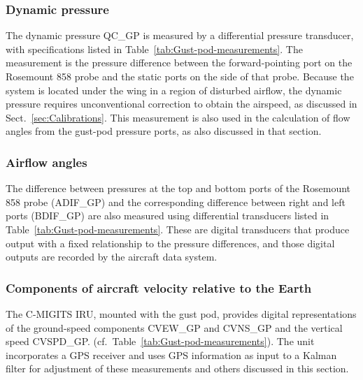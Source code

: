 \documentclass[12pt,twoside,english]{article}\usepackage[]{graphicx}\usepackage[]{color}
\let\OrgIndex\index
\renewcommand*{\index}[1]{\OrgIndex{#1}}
\begin{document}
{\subsubsection{Dynamic pressure}

The dynamic pressure QC\_GP is measured by a differential pressure transducer,  with specifications listed in Table~\ref{tab:Gust-pod-measurements}. The measurement is the pressure difference between the forward-pointing port on the Rosemount 858 probe and the static ports on the side of that probe. Because the system is located under the wing in a region of disturbed airflow, the dynamic pressure requires unconventional correction to obtain the airspeed, as discussed in Sect.~\ref{sec:Calibrations}. This measurement is also used in the calculation of flow angles from the gust-pod pressure ports, as also discussed in that section. 


\subsubsection{Airflow angles}

The difference between pressures at  the top and bottom ports of the Rosemount 858 probe (ADIF\_GP) and the corresponding difference between right and left ports (BDIF\_GP) are also measured using differential transducers listed in Table~\ref{tab:Gust-pod-measurements}. These are digital transducers that produce output with a fixed relationship to the pressure differences, and those digital outputs are recorded by the aircraft data system. 


\subsubsection{Components of aircraft velocity relative to the Earth}

The C-MIGITS IRU, mounted with the gust pod, provides digital representations of the ground-speed components CVEW\_GP and CVNS\_GP and the vertical speed CVSPD\_GP. (cf.~Table~\ref{tab:Gust-pod-measurements}). The unit incorporates a GPS receiver and uses GPS information as input to a Kalman filter for adjustment of these measurements and others discussed in this section. 


}
\end{document}
